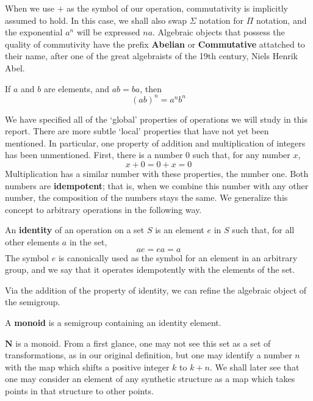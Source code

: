 When we use $+$ as the symbol of our operation, commutativity is implicitly assumed to hold. In this case, we shall also swap $\Sigma$ notation for $\Pi$ notation, and the exponential $a^n$ will be expressed $na$. Algebraic objects that possess the quality of commutivity have the prefix {\bf Abelian}  or {\bf Commutative}  attatched to their name, after one of the great algebraists of the 19th century, Niels Henrik Abel.

\begin{lemma}
    If $a$ and $b$ are elements, and $ab = ba$, then
    \[ (ab)^n = a^nb^n \]
\end{lemma}

We have specified all of the `global' properties of operations we will study in this report. There are more subtle `local' properties that have not yet been mentioned. In particular, one property of addition and multiplication of integers has been unmentioned. First, there is a number 0 such that, for any number $x$,
%
\[x + 0 = 0 + x = 0\]
%
Multiplication has a similar number with these properties, the number one. Both numbers are {\bf idempotent}; that is, when we combine this number with any other number, the composition of the numbers stays the same. We generalize this concept to arbitrary operations in the following way.

\begin{definition}
    An {\bf identity} of an operation on a set $S$ is an element $e$ in $S$ such that, for all other elements $a$ in the set,
    \[ ae = ea = a \]
    The symbol $e$ is canonically used as the symbol for an element in an arbitrary group, and we say that it operates idempotently with the elements of the set.
\end{definition}

Via the addition of the property of identity, we can refine the algebraic object of the semigroup.

\begin{definition}
    A {\bf monoid} is a semigroup containing an identity element.
\end{definition}

\begin{example}
    $\mathbf{N}$ is a monoid. From a first glance, one may not see this set as a set of transformations, as in our original definition, but one may identify a number $n$ with the map which shifts a positive integer $k$ to $k + n$. We shall later see that one may consider an element of any synthetic structure as a map which takes points in that structure to other points.
\end{example}

